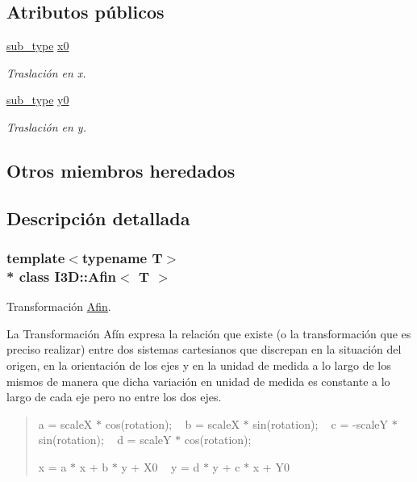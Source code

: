 \subsection*{Atributos públicos}
\begin{DoxyCompactItemize}
\item 
\hyperlink{class_i3_d_1_1_transform_ac087b4b8b9acb1b11a6caa2231d598c7}{sub\+\_\+type} \hyperlink{class_i3_d_1_1_afin_aff62b2c4443c19c78940f4113e67183b}{x0}
\begin{DoxyCompactList}\small\item\em Traslación en x. \end{DoxyCompactList}\item 
\hyperlink{class_i3_d_1_1_transform_ac087b4b8b9acb1b11a6caa2231d598c7}{sub\+\_\+type} \hyperlink{class_i3_d_1_1_afin_ac687b5efb2b75262c7aeeb31a2792c34}{y0}
\begin{DoxyCompactList}\small\item\em Traslación en y. \end{DoxyCompactList}\end{DoxyCompactItemize}
\subsection*{Otros miembros heredados}


\subsection{Descripción detallada}
\subsubsection*{template$<$typename T$>$\\*
class I3\+D\+::\+Afin$<$ T $>$}

Transformación \hyperlink{class_i3_d_1_1_afin}{Afin}. 

La Transformación Afín expresa la relación que existe (o la transformación que es preciso realizar) entre dos sistemas cartesianos que discrepan en la situación del origen, en la orientación de los ejes y en la unidad de medida a lo largo de los mismos de manera que dicha variación en unidad de medida es constante a lo largo de cada eje pero no entre los dos ejes.

\begin{quote}
a = scaleX $\ast$ cos(rotation); ~\newline
 b = scaleX $\ast$ sin(rotation); ~\newline
 c = -\/scaleY $\ast$ sin(rotation); ~\newline
 d = scaleY $\ast$ cos(rotation);

x\textquotesingle{} = a $\ast$ x + b $\ast$ y + X0 ~\newline
 y\textquotesingle{} = d $\ast$ y + c $\ast$ x + Y0 \end{quote}


